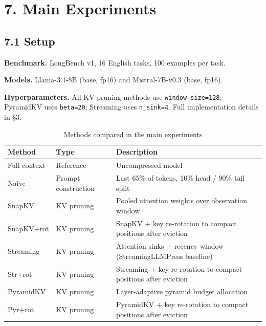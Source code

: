 \documentclass[10pt,letterpaper]{article}
\begin{document}
\hypertarget{main-experiments}{%
\section{7. Main Experiments}\label{main-experiments}}

\hypertarget{setup-1}{%
\subsection{7.1 Setup}\label{setup-1}}

\textbf{Benchmark.} LongBench v1, 16 English tasks, 100 examples per
task.

\textbf{Models.} Llama-3.1-8B (base, fp16) and Mistral-7B-v0.3 (base,
fp16).

\textbf{Hyperparameters.} All KV pruning methods use
\texttt{window\_size=128}; PyramidKV uses \texttt{beta=20}; Streaming
uses \texttt{n\_sink=4}. Full implementation details in §3.


\begin{table}[H]
\centering
\small
\caption{Methods compared in the main experiments}
\label{tab:methods}
\begin{tabular}{@{}p{}p{}p{}@{}}
\toprule
Method & Type & Description\\
\midrule
Full context & Reference        & Uncompressed model\\
Naive        & Prompt construction & Last 65\% of tokens, 10\% head / 90\% tail split\\
SnapKV       & KV pruning       & Pooled attention weights over observation window\\
SnapKV+rot   & KV pruning       & SnapKV + key re-rotation to compact positions after eviction\\
Streaming    & KV pruning       & Attention sinks + recency window (StreamingLLMPress baseline)\\
Str+rot      & KV pruning       & Streaming + key re-rotation to compact positions after eviction\\
PyramidKV    & KV pruning       & Layer-adaptive pyramid budget allocation\\
Pyr+rot      & KV pruning       & PyramidKV + key re-rotation to compact positions after eviction\\
\bottomrule
\end{tabular}
\end{table}
\end{document}
